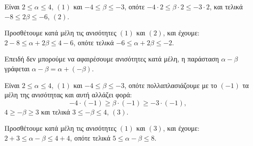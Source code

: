 
\begin{alist}
\item Είναι $2 \le \alpha \le 4$, $(1)$ και $-4 \le \beta \le -3$, οπότε $-4 \cdot 2 \le \beta \cdot 2 \le -3 \cdot 2$, και τελικά
$-8 \le 2\beta \le -6$, $(2)$.

Προσθέτουμε κατά μέλη τις ανισότητες $(1)$ και $(2)$, και έχουμε:
$2 - 8 \le \alpha + 2\beta \le 4 - 6$, οπότε τελικά $-6 \le \alpha + 2\beta \le -2$.

\item Επειδή δεν μπορούμε να αφαιρέσουμε ανισότητες κατά μέλη, η παράσταση $\alpha - \beta$
γράφεται $\alpha - \beta = \alpha + (-\beta)$.

Είναι $2 \le \alpha \le 4$, $(1)$ και
$-4 \le \beta \le -3$, οπότε πολλαπλασιάζουμε με το $(-1)$ τα μέλη της ανισότητας και αυτή αλλάζει φορά:
\[-4 \cdot (-1) \ge \beta \cdot (-1) \ge -3 \cdot (-1),\]
$4 \ge -\beta \ge 3$ και τελικά $3 \le -\beta \le 4$, $(3)$.

Προσθέτουμε κατά μέλη τις ανισότητες $(1)$ και $(3)$, και έχουμε:
$2 + 3 \le \alpha - \beta \le 4 + 4$, οπότε τελικά $5 \le \alpha - \beta \le 8$.
\end{alist}

